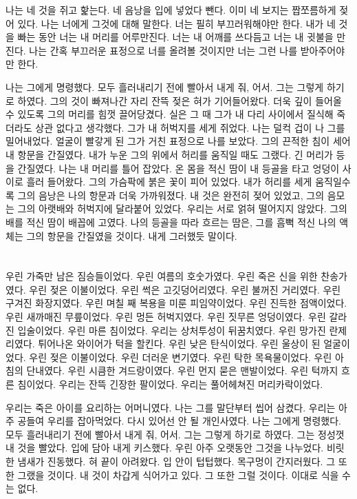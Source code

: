 나는 네 것을 쥐고 핥는다. 네 음낭을 입에 넣었다 뺀다. 이미 네 보지는 짭쪼름하게 젖어 있다. 나는 너에게 그것에 대해 말한다. 너는 필히 부끄러워해야만 한다. 내가 네 것을 빠는 동안 너는 내 머리를 어루만진다. 너는 내 어깨를 쓰다듬고 너는 내 귓불을 만진다. 나는 간혹 부끄러운 표정으로 너를 올려볼 것이지만 너는 그런 나를 받아주어야만 한다.



나는 그에게 명령했다. 모두 흘러내리기 전에 빨아서 내게 줘, 어서. 그는 그렇게 하기로 하였다. 그의 것이 빠져나간 자리 잔뜩 젖은 혀가 기어들어왔다. 더욱 깊이 들어올 수 있도록 그의 머리를 힘껏 끌어당겼다. 실은 그 때 그가 내 다리 사이에서 질식해 죽더라도 상관 없다고 생각했다. 그가 내 허벅지를 세게 쥐었다. 나는 덜컥 겁이 나 그를 밀어내었다. 얼굴이 빨갛게 된 그가 거친 표정으로 나를 보았다. 그의 끈적한 침이 세어 내 항문을 간질였다. 내가 누운 그의 위에서 허리를 움직일 때도 그랬다. 긴 머리가 등을 간질였다. 나는 내 머리를 틀어 잡았다. 온 몸을 적신 땀이 내 등골을 타고 엉덩이 사이로 흘러 들어왔다. 그의 가슴팍에 붉은 꽃이 피어 있었다. 내가 허리를 세게 움직일수록 그의 음낭은 나의 항문과 더욱 가까워졌다. 내 것은 완전히 젖어 있었고, 그의 음모는 그의 아랫배와 허벅지에 달라붙어 있었다. 우리는 서로 얽혀 떨어지지 않았다. 그의 배를 적신 땀이 배꼽에 고였다. 나의 등골을 따라 흐르는 땀은, 그를 흠뻑 적신 나의 액체는 그의 항문을 간질였을 것이다. 내게 그러했듯 말이다.



\hypertarget{section-1}{%

\section{}\label{section-1}}



우린 가죽만 남은 짐승들이었다. 우린 여름의 호숫가였다. 우린 죽은 신을 위한 찬송가였다. 우린 젖은 이불이었다. 우린 썩은 고깃덩어리였다. 우린 불꺼진 거리였다. 우린 구겨진 화장지였다. 우린 며칠 째 복용을 미룬 피임약이었다. 우린 진득한 점액이었다. 우린 새까매진 무릎이었다. 우린 멍든 허벅지였다. 우린 짓무른 엉덩이였다. 우린 갈라진 입술이었다. 우린 마른 침이었다. 우리는 상처투성이 뒤꿈치였다. 우린 망가진 란제리였다. 튀어나온 와이어가 턱을 할킨다. 우린 낮은 탄식이었다. 우린 울상이 된 얼굴이었다. 우린 젖은 이불이었다. 우린 더러운 변기였다. 우린 탁한 목욕물이었다. 우린 아침의 단내였다. 우린 시큼한 겨드랑이였다. 우린 먼지 묻은 맨발이었다. 우린 턱까지 흐른 침이었다. 우리는 잔뜩 긴장한 팔이었다. 우리는 풀어헤쳐진 머리카락이었다.



우리는 죽은 아이를 요리하는 어머니였다. 나는 그를 말단부터 씹어 삼켰다. 우리는 아주 공들여 우리를 잡아먹었다. 다시 있어선 안 될 개인사였다. 나는 그에게 명령했다. 모두 흘러내리기 전에 빨아서 내게 줘, 어서. 그는 그렇게 하기로 하였다. 그는 정성껏 내 것을 빨았다. 입에 담아 내게 키스했다. 우린 아주 오랫동안 그것을 나누었다. 비릿한 냄새가 진동했다. 혀 끝이 아려왔다. 입 안이 텁텁했다. 목구멍이 간지러웠다. 그 또한 그랬을 것이다. 내 것이 차갑게 식어가고 있다. 그 또한 그럴 것이다. 이대로 식을 수는 없다.

